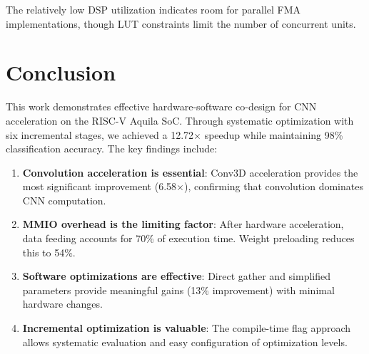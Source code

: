 \documentclass[conference]{IEEEtran}
\begin{document}
The relatively low DSP utilization indicates room for parallel FMA implementations, though LUT constraints limit the number of concurrent units.


\section{Conclusion}

This work demonstrates effective hardware-software co-design for CNN acceleration on the RISC-V Aquila SoC. Through systematic optimization with six incremental stages, we achieved a 12.72$\times$ speedup while maintaining 98\% classification accuracy. The key findings include:

\begin{enumerate}
    \item \textbf{Convolution acceleration is essential}: Conv3D acceleration provides the most significant improvement (6.58$\times$), confirming that convolution dominates CNN computation.
    
    \item \textbf{MMIO overhead is the limiting factor}: After hardware acceleration, data feeding accounts for 70\% of execution time. Weight preloading reduces this to 54\%.
    
    \item \textbf{Software optimizations are effective}: Direct gather and simplified parameters provide meaningful gains (13\% improvement) with minimal hardware changes.
    
    \item \textbf{Incremental optimization is valuable}: The compile-time flag approach allows systematic evaluation and easy configuration of optimization levels.
\end{enumerate}
\end{document}
